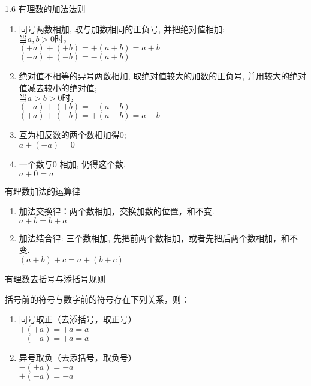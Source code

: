 \documentclass[aspectratio=169]{ctexbeamer} %
\date{\today}
\begin{document}
\begin{frame}[t]{1.6 有理数的加法法则}
\begin{spacing}{1.1} %
\normalsize
\begin{enumerate}[label={\arabic*.}]
\item 同号两数相加, 取与加数相同的正负号, 并把绝对值相加; \\
$\text{当}a,b  > 0\text{时，}$ \\
$(+a) + (+b) = +(a+b) = a + b$ \\
$(-a) + (-b) = -(a+b)$ \\
\item 绝对值不相等的异号两数相加, 取绝对值较大的加数的正负号, 并用较大的绝对值减去较小的绝对值; \\
$\text{当}a > b > 0\text{时，}$ \\
$(-a) + (+b) = -(a-b)$ \\
$(+a) + (-b) = +(a-b) = a - b$ \\
\item 互为相反数的两个数相加得0; \\
 $a + (-a) = 0$ \\
\item 一个数与0 相加, 仍得这个数. \\
$a + 0 = a $\\
\end{enumerate}
\end{spacing}
\end{frame}

\begin{frame}[t]{有理数加法的运算律}
\begin{spacing}{1.5} %
\Large
\begin{enumerate}[label={\arabic*.}]
\item 加法交换律：两个数相加，交换加数的位置，和不变. \\
$a + b = b + a$
\item 加法结合律: 三个数相加, 先把前两个数相加，或者先把后两个数相加，和不变. \\
$(a + b) + c = a + (b + c)$
\end{enumerate}
\end{spacing}
\end{frame}

\begin{frame}[t]{有理数去括号与添括号规则}
\begin{spacing}{1.2} %
\Large
括号前的符号与数字前的符号存在下列关系，则：
\begin{enumerate}[label={\arabic*.}]
\item 同号取正（去添括号，取正号） \\
$+(+a) = +a = a$ \\
$-(-a) = +a = a$ 
\item 异号取负（去添括号，取负号）\\
$-(+a) = -a$ \\
$+(-a) = -a$ \\
\end{enumerate}
\end{spacing}
\end{frame}
\end{document}
